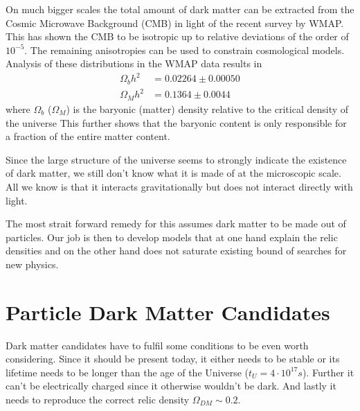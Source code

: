 On much bigger scales the total amount of dark matter can be extracted from the Cosmic Microwave Background (CMB) in light of the recent survey by WMAP.
This has shown the CMB to be isotropic up to relative deviations of the order of $10^{-5}$. The remaining anisotropies can be used to constrain cosmological models.  Analysis of these distributions in the WMAP data results in
\begin{align}
\Omega_bh^2&=0.02264\pm0.00050\\
\Omega_Mh^2&=0.1364\pm0.0044
\end{align}
where $\Omega_b$ ($\Omega_M$) is the baryonic (matter) density relative to the critical density of the universe 
This further shows that the baryonic content is only responsible for a fraction of the entire matter content.


Since the large structure of the universe seems to strongly indicate the existence of dark matter, we still don't know what it is made of at the microscopic scale. All we know is that it interacts gravitationally but does not interact directly with light. 

The most strait forward remedy for this assumes dark matter to be made out of particles. Our job is then to develop models that at one hand explain the relic densities and on the other hand does not saturate existing bound of searches for new physics.

\section{Particle Dark Matter Candidates}
Dark matter candidates have to fulfil some conditions to be even worth considering. Since it should be present today, it either needs to be stable or its lifetime needs to be longer than the age of the Universe ($t_U=4\cdot 10^{17}s$).
Further it can't be electrically charged since it otherwise wouldn't be dark. And lastly it needs to reproduce the correct relic density
$\Omega_{DM}\sim 0.2$.
